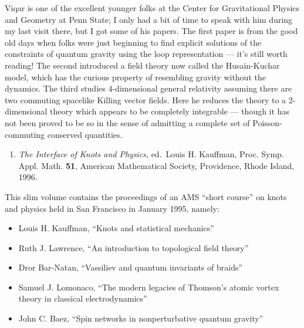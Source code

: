 \documentclass{article}
\def\tightlist{}
\renewcommand{\texttt}[1]{%
  \begingroup
  \ttfamily
  \begingroup\lccode`~=`/\lowercase{\endgroup\def~}{/\discretionary{}{}{}}%
  \begingroup\lccode`~=`[\lowercase{\endgroup\def~}{[\discretionary{}{}{}}%
  \begingroup\lccode`~=`.\lowercase{\endgroup\def~}{.\discretionary{}{}{}}%
  \catcode`/=\active\catcode`[=\active\catcode`.=\active
  \scantokens{#1\noexpand}%
  \endgroup
}
\begin{document}

Viqar is one of the excellent younger folks at the Center for
Gravitational Physics and Geometry at Penn State; I only had a bit of
time to speak with him during my last visit there, but I got some of his
papers. The first paper is from the good old days when folks were just
beginning to find explicit solutions of the constraints of quantum
gravity using the loop representation --- it's still worth reading! The
second introduced a field theory now called the Husain-Kuchar model,
which has the curious property of resembling gravity without the
dynamics. The third studies 4-dimensional general relativity assuming
there are two commuting spacelike Killing vector fields. Here he reduces
the theory to a 2-dimensional theory which appears to be completely
integrable --- though it has not been proved to be so in the sense of
admitting a complete set of Poisson-commuting conserved quantities.

\begin{enumerate}
\def\labelenumi{\arabic{enumi})}
\setcounter{enumi}{7}
\tightlist
\item
  \emph{The Interface of Knots and Physics}, ed.~Louis H. Kauffman,
  Proc. Symp. Appl. Math. \textbf{51}, American Mathematical Society,
  Providence, Rhode Island, 1996.
\end{enumerate}

This slim volume contains the proceedings of an AMS ``short course'' on
knots and physics held in San Francisco in January 1995, namely:

\begin{itemize}
\tightlist
\item
  Louis H. Kauffman, ``Knots and statistical mechanics''
\item
  Ruth J. Lawrence, ``An introduction to topological field theory''
\item
  Dror Bar-Natan, ``Vassiliev and quantum invariants of braids''
\item
  Samuel J. Lomonaco, ``The modern legacies of Thomson's atomic vortex
  theory in classical electrodynamics''
\item
  John C. Baez, ``Spin networks in nonperturbative quantum gravity''
\end{itemize}
\end{document}
